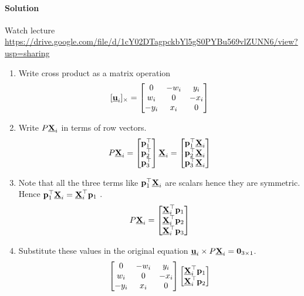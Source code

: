 \documentclass{article}
\begin{document}
\paragraph*{Solution}
Watch lecture \url{https://drive.google.com/file/d/1cY02DTagpckbYl5gS0PYBu569vlZUNN6/view?usp=sharing}
\begin{enumerate}
\item Write cross product as a matrix operation
  \[ [\underline{\mathbf{u}}_i]_{\times}= \begin{bmatrix}
      0 & -w_i & y_i \\
      w_i & 0 & -x_i \\
      -y_i & x_i & 0
    \end{bmatrix}\]
  \item Write $P \underline{\mathbf{X}}_i$ in terms of row vectors.
    \[ P \underline{\mathbf{X}}_i = \begin{bmatrix}
        \mathbf{p}_1^\top
        \\
        \mathbf{p}_2^\top
        \\
        \mathbf{p}_3^\top
      \end{bmatrix}\underline{\mathbf{X}}_i =  \begin{bmatrix}
        \mathbf{p}_1^\top\underline{\mathbf{X}}_i
        \\
        \mathbf{p}_2^\top\underline{\mathbf{X}}_i
        \\
        \mathbf{p}_3^\top\underline{\mathbf{X}}_i
      \end{bmatrix}\]
    \item Note that all the three terms like $\mathbf{p}_1^\top \underline{\mathbf{X}}_i$ are scalars
      hence they are symmetric. Hence $\mathbf{p}_1^\top \underline{\mathbf{X}}_i = \underline{\mathbf{X}}_i^\top \mathbf{p}_1$ .
      \[ P \underline{\mathbf{X}}_i = \begin{bmatrix}
          \underline{\mathbf{X}}_i^\top\mathbf{p}_1
                 \\
          \underline{\mathbf{X}}_i^\top \mathbf{p}_2
                 \\
          \underline{\mathbf{X}}_i^\top\mathbf{p}_3
        \end{bmatrix}\]
    \item Substitute these values in the original equation $\underline{\mathbf{u}}_i \times
      P\underline{\mathbf{X}}_i = \mathbf{0}_{3\times 1}$.
      \[
        \begin{bmatrix}
          0 & -w_i & y_i \\
          w_i & 0 & -x_i \\
          -y_i & x_i & 0
        \end{bmatrix}
        \begin{bmatrix}
          \underline{\mathbf{X}}_i^\top\mathbf{p}_1
          \\
          \underline{\mathbf{X}}_i^\top \mathbf{p}_2

\end{bmatrix}\]
\end{enumerate}
\end{document}
